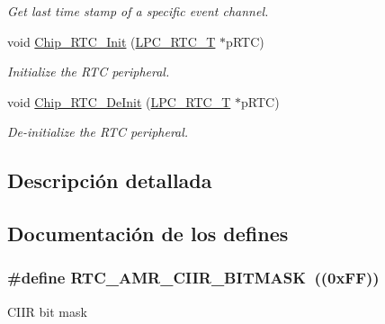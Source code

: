 \begin{DoxyCompactItemize}
\begin{DoxyCompactList}\small\item\em Get last time stamp of a specific event channel. \end{DoxyCompactList}\item 
void \hyperlink{group___r_t_c__18_x_x__43_x_x_gac37fe41fed088f1336797e05674125ff}{Chip\+\_\+\+R\+T\+C\+\_\+\+Init} (\hyperlink{struct_l_p_c___r_t_c___t}{L\+P\+C\+\_\+\+R\+T\+C\+\_\+T} $\ast$p\+R\+TC)
\begin{DoxyCompactList}\small\item\em Initialize the R\+TC peripheral. \end{DoxyCompactList}\item 
void \hyperlink{group___r_t_c__18_x_x__43_x_x_ga63cc16f1c4b72523e0e67a6c651f0026}{Chip\+\_\+\+R\+T\+C\+\_\+\+De\+Init} (\hyperlink{struct_l_p_c___r_t_c___t}{L\+P\+C\+\_\+\+R\+T\+C\+\_\+T} $\ast$p\+R\+TC)
\begin{DoxyCompactList}\small\item\em De-\/initialize the R\+TC peripheral. \end{DoxyCompactList}\end{DoxyCompactItemize}


\subsection{Descripción detallada}


\subsection{Documentación de los \textquotesingle{}defines\textquotesingle{}}
\subsubsection[{\texorpdfstring{R\+T\+C\+\_\+\+A\+M\+R\+\_\+\+C\+I\+I\+R\+\_\+\+B\+I\+T\+M\+A\+SK}{RTC_AMR_CIIR_BITMASK}}]{\setlength{\rightskip}{0pt plus 5cm}\#define R\+T\+C\+\_\+\+A\+M\+R\+\_\+\+C\+I\+I\+R\+\_\+\+B\+I\+T\+M\+A\+SK~((0x\+F\+F))}\hypertarget{group___r_t_c__18_x_x__43_x_x_gafcc754fba01521c5aa4f1775b889e894}{}\label{group___r_t_c__18_x_x__43_x_x_gafcc754fba01521c5aa4f1775b889e894}
C\+I\+IR bit mask 

